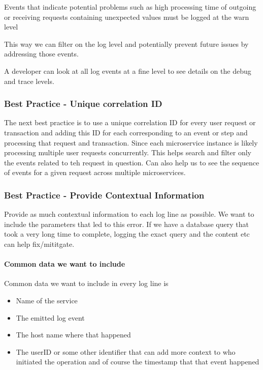 \documentclass[a4paper, 11pt]{book}
\begin{document}
    Events that indicate potential problems such as high processing time of outgoing or receiving requests containing unexpected values must be logged at the warn level

    This way we can filter on the log level and potentially prevent future issues by addressing those events.

    A developer can look at all log events at a fine level to see details on the debug and trace levels.

    \subsubsection{Best Practice - Unique correlation ID}
    The next best practice is to use a unique correlation ID for every user request or transaction and adding this ID for each corresponding to an event or step and processing that request and transaction.
    Since each microservice instance is likely processing multiple user requests concurrently.
    This helps search and filter only the events related to teh request in question.
    Can also help us to see the sequence of events for a given request across multiple microservices.

    \subsubsection{Best Practice - Provide Contextual Information}
    Provide as much contextual information to each log line as possible.
    We want to include the parameters that led to this error.
    If we have a database query that took a very long time to complete, logging the exact query and the content etc can help fix/mititgate.

    \paragraph{Common data we want to include}
    Common data we want to include in every log line is
    \begin{itemize}
        \item Name of the service
        \item The emitted log event
        \item The host name where that happened
        \item The userID or some other identifier that can add more context to who initiated the operation and of course the timestamp that that event happened
    \end{itemize}
\end{document}
